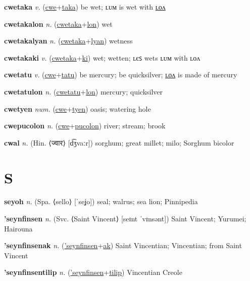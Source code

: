 \textbf{\hypertarget{cwetaka}{cwetaka}} \textit{v.} (\hyperlink{cwe}{cwe}+\allowbreak \hyperlink{taka}{taka})
be wet; ʟᴜᴍ is wet with \hyperlink{cwetakalon}{ʟᴏᴧ}

\textbf{\hypertarget{cwetakalon}{cwetakalon}} \textit{n.} (\hyperlink{cwetaka}{cwetaka}+\allowbreak \hyperlink{lon}{lon})
wet

\textbf{\hypertarget{cwetakalyan}{cwetakalyan}} \textit{n.} (\hyperlink{cwetaka}{cwetaka}+\allowbreak \hyperlink{lyan}{lyan})
wetness

\textbf{\hypertarget{cwetakaki}{cwetakaki}} \textit{v.} (\hyperlink{cwetaka}{cwetaka}+\allowbreak \hyperlink{ki}{ki})
wet; wetten; ʟєꜱ wets ʟᴜᴍ with ʟᴏᴧ

\textbf{\hypertarget{cwetatu}{cwetatu}} \textit{v.} (\hyperlink{cwe}{cwe}+\allowbreak \hyperlink{tatu}{tatu})
be mercury; be quicksilver; \hyperlink{cwetatulon}{ʟᴏᴧ} is made of mercury

\textbf{\hypertarget{cwetatulon}{cwetatulon}} \textit{n.} (\hyperlink{cwetatu}{cwetatu}+\allowbreak \hyperlink{lon}{lon})
mercury; quicksilver

\textbf{\hypertarget{cwetyen}{cwetyen}} \textit{num.} (\hyperlink{cwe}{cwe}+\allowbreak \hyperlink{tyen}{tyen})
oasis; watering hole

\textbf{\hypertarget{cwepucolon}{cwepucolon}} \textit{n.} (\hyperlink{cwe}{cwe}+\allowbreak \hyperlink{pucolon}{pucolon})
river; stream; brook

\textbf{\hypertarget{cwal}{cwal}} \textit{n.} (Hin. ⟨{\devanagari{}ज्वार}⟩ [d͡ʒvaːr])
sorghum; great millet; milo; Sorghum bicolor

\section{S}

\textbf{\hypertarget{seyoh}{seyoh}} \textit{n.} (Spa. ⟨sello⟩ [ˈseʝo])
seal; walrus; sea lion; Pinnipedia

\textbf{\hypertarget{'seynfinsen}{'seynfinsen}} \textit{n.} (Svc. ⟨Saint Vincent⟩ [seɪnt ˈvɪnsənt])
Saint Vincent; Yurumei; Hairouna

\textbf{\hypertarget{'seynfinsenak}{'seynfinsenak}} \textit{n.} (\hyperlink{'seynfinsen}{'seynfinsen}+\allowbreak \hyperlink{ak}{ak})
Saint Vincentian; Vincentian; from Saint Vincent

\textbf{\hypertarget{'seynfinsentilip}{'seynfinsentilip}} \textit{n.} (\hyperlink{'seynfinsen}{'seynfinsen}+\allowbreak \hyperlink{tilip}{tilip})
Vincentian Creole

